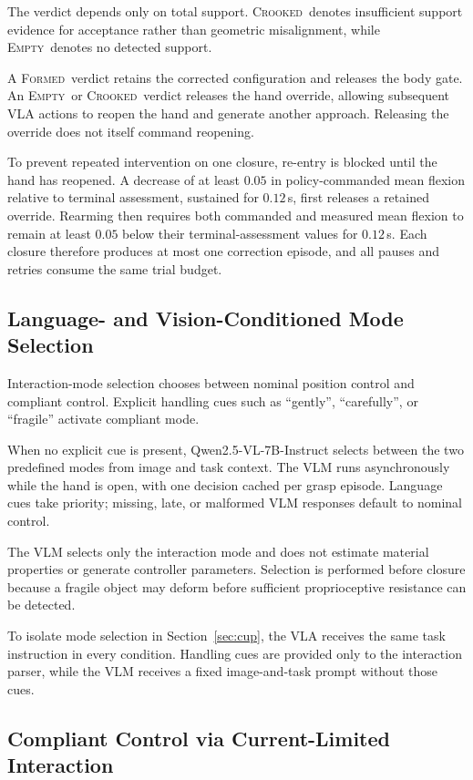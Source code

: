 \documentclass[letterpaper,10pt,conference]{ieeeconf}
\newcommand{\formed}{\textsc{Formed}}
\newcommand{\crooked}{\textsc{Crooked}}
\newcommand{\emptygrasp}{\textsc{Empty}}
\begin{document}
The verdict depends only on total support. \crooked\ denotes insufficient
support evidence for acceptance rather than geometric misalignment, while
\emptygrasp\ denotes no detected support.

A \formed\ verdict retains the corrected configuration and releases the body
gate. An \emptygrasp\ or \crooked\ verdict releases the hand override, allowing
subsequent VLA actions to reopen the hand and generate another approach.
Releasing the override does not itself command reopening.

To prevent repeated intervention on one closure, re-entry is blocked until
the hand has reopened. A decrease of at least $0.05$ in policy-commanded mean
flexion relative to terminal assessment, sustained for $0.12$\,s, first
releases a retained override. Rearming then requires both commanded and
measured mean flexion to remain at least $0.05$ below their terminal-assessment
values for $0.12$\,s. Each closure therefore produces at most one correction
episode, and all pauses and retries consume the same trial budget.

\subsection{Language- and Vision-Conditioned Mode Selection}
\label{sec:mode_selection}

Interaction-mode selection chooses between nominal position control and
compliant control. Explicit handling cues such as ``gently'', ``carefully'',
or ``fragile'' activate compliant mode.

When no explicit cue is present, Qwen2.5-VL-7B-Instruct \cite{qwen} selects
between the two predefined modes from image and task context. The VLM runs
asynchronously while the hand is open, with one decision cached per grasp
episode. Language cues take priority; missing, late, or malformed VLM
responses default to nominal control.

The VLM selects only the interaction mode and does not estimate material
properties or generate controller parameters. Selection is performed before
closure because a fragile object may deform before sufficient proprioceptive
resistance can be detected.

To isolate mode selection in Section~\ref{sec:cup}, the VLA receives the same
task instruction in every condition. Handling cues are provided only to the
interaction parser, while the VLM receives a fixed image-and-task prompt
without those cues.

\subsection{Compliant Control via Current-Limited Interaction}
\label{sec:compliant}
\end{document}
